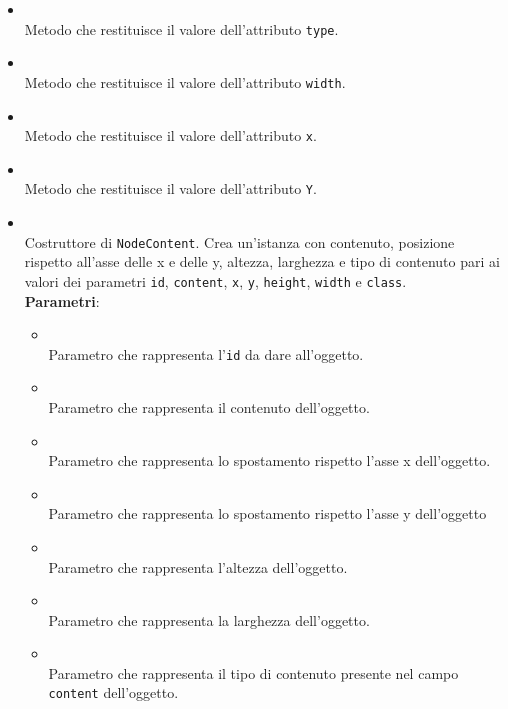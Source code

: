 \begin{itemize}
\begin{itemize}
\item {}
\\ Metodo che restituisce il valore dell'attributo \texttt{type}.
\item {}
\\ Metodo che restituisce il valore dell'attributo \texttt{width}.
\item {}
\\ Metodo che restituisce il valore dell'attributo \texttt{x}.
\item {}
\\ Metodo che restituisce il valore dell'attributo \texttt{Y}.
\item {}
\\ Costruttore di \texttt{NodeContent}. Crea un'istanza con contenuto, posizione rispetto all'asse delle x e delle y, altezza, larghezza e tipo di contenuto pari ai valori dei parametri \texttt{id}, \texttt{content}, \texttt{x}, \texttt{y}, \texttt{height}, \texttt{width} e \texttt{class}.
\\ \textbf{Parametri}:
\begin{itemize}
\item {}
\\ Parametro che rappresenta l'\texttt{id} da dare all'oggetto.
\item {}
\\ Parametro che rappresenta il contenuto dell'oggetto.
\item {}
\\ Parametro che rappresenta lo spostamento rispetto l'asse x dell'oggetto.
\item {}
\\ Parametro che rappresenta lo spostamento rispetto l'asse y dell'oggetto
\item {}
\\ Parametro che rappresenta l'altezza dell'oggetto.
\item {}
\\ Parametro che rappresenta la larghezza dell'oggetto.
\item {}
\\ Parametro che rappresenta il tipo di contenuto presente nel campo \texttt{content} dell'oggetto.

\end{itemize}
\end{itemize}
\end{itemize}

